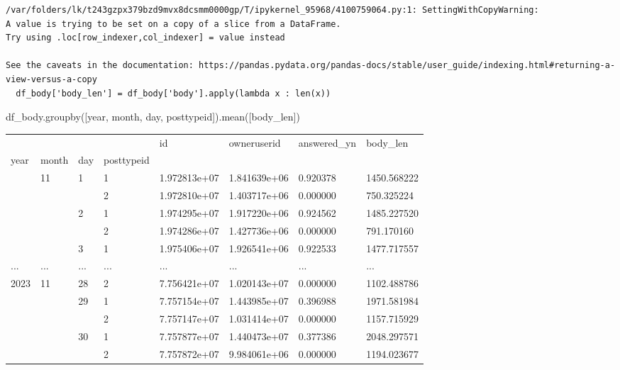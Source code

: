 \documentclass[
  letterpaper,
  DIV=11,
  numbers=noendperiod]{scrartcl}
\newenvironment{Shaded}{\begin{snugshade}}{\end{snugshade}}
\newcommand{\NormalTok}[1]{\textcolor[rgb]{0.00,0.23,0.31}{#1}}
\newcommand{\StringTok}[1]{\textcolor[rgb]{0.13,0.47,0.30}{#1}}
\begin{document}
\begin{verbatim}
/var/folders/lk/t243gzpx379bzd9mvx8dcsmm0000gp/T/ipykernel_95968/4100759064.py:1: SettingWithCopyWarning: 
A value is trying to be set on a copy of a slice from a DataFrame.
Try using .loc[row_indexer,col_indexer] = value instead

See the caveats in the documentation: https://pandas.pydata.org/pandas-docs/stable/user_guide/indexing.html#returning-a-view-versus-a-copy
  df_body['body_len'] = df_body['body'].apply(lambda x : len(x))
\end{verbatim}

\begin{Shaded}
\begin{Highlighting}[]
\NormalTok{df\_body.groupby([}\StringTok{\textquotesingle{}year\textquotesingle{}}\NormalTok{, }\StringTok{\textquotesingle{}month\textquotesingle{}}\NormalTok{, }\StringTok{\textquotesingle{}day\textquotesingle{}}\NormalTok{, }\StringTok{\textquotesingle{}posttypeid\textquotesingle{}}\NormalTok{]).mean([}\StringTok{\textquotesingle{}body\_len\textquotesingle{}}\NormalTok{])}
\end{Highlighting}
\end{Shaded}

\begin{longtable}[]{@{}llllllll@{}}
\toprule\noalign{}
& & & & id & owneruserid & answered\_yn & body\_len \\
year & month & day & posttypeid & & & & \\
\midrule\noalign{}
\endhead
\bottomrule\noalign{}
\endlastfoot
\multirow{5}{=}{2013} & \multirow{5}{=}{11} & \multirow{2}{=}{1} & 1 &
1.972813e+07 & 1.841639e+06 & 0.920378 & 1450.568222 \\
& & & 2 & 1.972810e+07 & 1.403717e+06 & 0.000000 & 750.325224 \\
& & \multirow{2}{=}{2} & 1 & 1.974295e+07 & 1.917220e+06 & 0.924562 &
1485.227520 \\
& & & 2 & 1.974286e+07 & 1.427736e+06 & 0.000000 & 791.170160 \\
& & 3 & 1 & 1.975406e+07 & 1.926541e+06 & 0.922533 & 1477.717557 \\
... & ... & ... & ... & ... & ... & ... & ... \\
\multirow{5}{=}{2023} & \multirow{5}{=}{11} & 28 & 2 & 7.756421e+07 &
1.020143e+07 & 0.000000 & 1102.488786 \\
& & \multirow{2}{=}{29} & 1 & 7.757154e+07 & 1.443985e+07 & 0.396988 &
1971.581984 \\
& & & 2 & 7.757147e+07 & 1.031414e+07 & 0.000000 & 1157.715929 \\
& & \multirow{2}{=}{30} & 1 & 7.757877e+07 & 1.440473e+07 & 0.377386 &
2048.297571 \\
& & & 2 & 7.757872e+07 & 9.984061e+06 & 0.000000 & 1194.023677 \\
\end{longtable}
\end{document}
